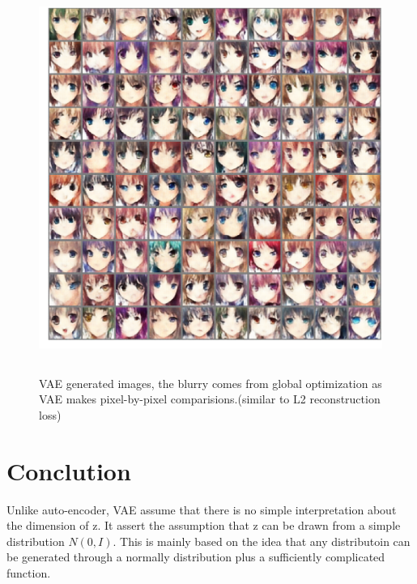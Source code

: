 \documentclass{article}
\begin{document}
\begin{figure}[h]
\centering
\includegraphics[width=5in,height=5in]{result1}
\caption{VAE generated images, the blurry comes from global optimization as VAE makes pixel-by-pixel comparisions.(similar to L2 reconstruction loss)}
\end{figure}

\section{Conclution}
Unlike auto-encoder, VAE assume that there is no simple interpretation about the dimension of z. It assert the assumption that z can be drawn from a simple distribution $N(0,I)$. This is mainly based on the idea that any distributoin can be generated through a normally distribution plus a sufficiently complicated function.




\end{document}
